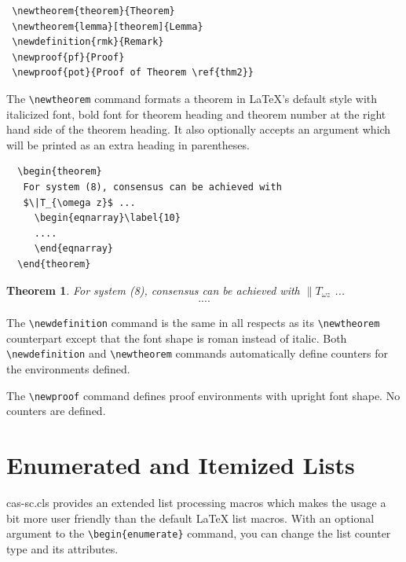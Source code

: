 \documentclass[a4paper,fleqn]{cas-sc}
\begin{document}
\begin{verbatim}
 \newtheorem{theorem}{Theorem}
 \newtheorem{lemma}[theorem]{Lemma}
 \newdefinition{rmk}{Remark}
 \newproof{pf}{Proof}
 \newproof{pot}{Proof of Theorem \ref{thm2}}
\end{verbatim}


The \verb+\newtheorem+ command formats a
theorem in \LaTeX's default style with italicized font, bold font
for theorem heading and theorem number at the right hand side of the
theorem heading.  It also optionally accepts an argument which
will be printed as an extra heading in parentheses.

\begin{verbatim}
  \begin{theorem}
   For system (8), consensus can be achieved with
   $\|T_{\omega z}$ ...
     \begin{eqnarray}\label{10}
     ....
     \end{eqnarray}
  \end{theorem}
\end{verbatim}

\newtheorem{theorem}{Theorem}

\begin{theorem}
For system (8), consensus can be achieved with
$\|T_{\omega z}$ ...
\begin{eqnarray}\label{10}
....
\end{eqnarray}
\end{theorem}

The \verb+\newdefinition+ command is the same in
all respects as its \verb+\newtheorem+ counterpart except that
the font shape is roman instead of italic.  Both
\verb+\newdefinition+ and \verb+\newtheorem+ commands
automatically define counters for the environments defined.

The \verb+\newproof+ command defines proof environments with
upright font shape.  No counters are defined.


\section[Enumerated ...]{Enumerated and Itemized Lists}
{cas-sc.cls} provides an extended list processing macros
which makes the usage a bit more user friendly than the default
\LaTeX{} list macros.   With an optional argument to the
\verb+\begin{enumerate}+ command, you can change the list counter
type and its attributes.
\end{document}
